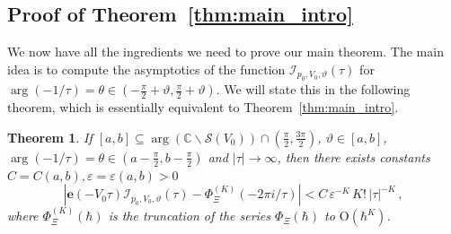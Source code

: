 \documentclass[12pt,reqno]{amsart}
\newtheorem{theorem}{Theorem}[section]
\theoremstyle{definition}
\def\BC{\mathbb C}
\def\calI{\mathcal I}
\def\calS{\mathcal S}
\def\be{\begin{equation}}
\def\ee{\end{equation}}
\def\e{\mathbf e}
\renewcommand{\=}{\;=\;}
\begin{document}
\subsection{Proof of Theorem~\ref{thm:main_intro}}\label{sec:proof_main}
We now have all the ingredients we need to prove our main theorem. The main idea is to compute the asymptotics of the function $\calI_{p_0,V_0,\vartheta}(\tau)$ for $\arg(-1/\tau)=\theta\in(-\tfrac{\pi}{2}+\vartheta,\tfrac{\pi}{2}+\vartheta)$. We will state this in the following theorem, which is essentially equivalent to Theorem~\ref{thm:main_intro}.
\begin{theorem}
If $[a,b]\subseteq\arg(\BC\backslash\calS(V_{0}))\cap(\tfrac{\pi}{2},\tfrac{3\pi}{2})$, $\vartheta\in[a,b]$, $\arg(-1/\tau)=\theta\in(a-\tfrac{\pi}{2},b-\tfrac{\pi}{2})$ and $|\tau|\to\infty$, then there exists constants $C=C(a,b),\varepsilon=\varepsilon(a,b)>0$
\be
  |\e(-V_0\tau)
  \calI_{p_0,V_0,\vartheta}(\tau)
  -
  \Phi_{\Xi}^{(K)}(-2\pi i/\tau)|
  <
  C\,\varepsilon^{-K}\,K!\,|\tau|^{-K}\,,
\ee
where $\Phi_{\Xi}^{(K)}(\hbar)$ is the truncation of the series $\Phi_{\Xi}(\hbar)$ to $\mathrm{O}(\hbar^{K})$.
\end{theorem}
\end{document}
